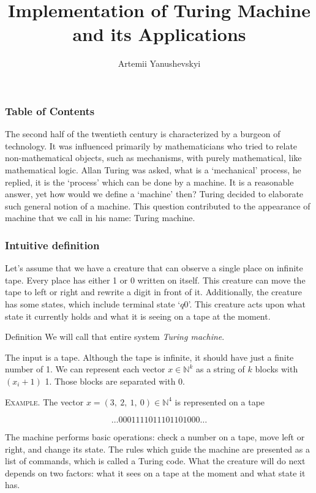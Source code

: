 \documentclass{beamer}
\title{Implementation of Turing Machine and its Applications}
\author{Artemii Yanushevskyi}
\institute{KNU}
\date{}
\begin{document}
\frame{\titlepage}

\begin{frame}
\frametitle{Table of Contents}
\tableofcontents
\end{frame}

\begin{frame}
	The second half of the twentieth century is characterized by a burgeon of technology. It was influenced primarily by mathematicians who tried to relate non-mathematical objects, such as mechanisms, with purely mathematical, like mathematical logic. Allan Turing was asked, what is a `mechanical' process, he replied, it is the `process' which can be done by a machine. It is a reasonable answer, yet how would we define a `machine' then? Turing decided to elaborate such general notion of a machine. This question contributed to the appearance of machine that we call in his name: Turing machine.
\end{frame}

\begin{frame}
\frametitle{Intuitive definition}
Let's assume that we have a creature that can observe a single place on infinite tape. Every place has either 1 or 0 written on itself. This creature can move the tape to left or right and rewrite a digit in front of it. Additionally, the creature has some states, which include terminal state `$q$0'. This creature acts upon what state it currently holds and what it is seeing on a tape at the moment. 

\begin{block}{Definition}
We will call that entire system \emph{Turing machine}.
\end{block}

\end{frame}


\begin{frame}
The input is a tape. Although the tape is infinite, it should have just a finite number of 1.
We can represent each vector $x\in\mathbb{N}^k$ as a string of $k$ blocks with $(x_i+1)$ 1. Those blocks are separated with 0. 


\textsc{Example.} The vector $x=(3,\ 2,\ 1,\ 0)\in\mathbb{N}^4$ is represented on a tape

{\large $$\dots 0001111011101101000\dots$$}

\end{frame}

\begin{frame}
The machine performs basic operations: check a number on a tape, move left or right, and change its state. The rules which guide the machine are presented as a list of commands, which is called a Turing code. What the creature will do next depends on two factors: what it sees on a tape at the moment and what state it has.
\end{frame}
\end{document}
